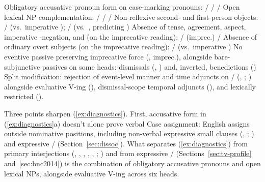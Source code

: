 \documentclass[12pt]{article}
\begin{document}
\ea\label{ex:diagnostics}
\ea Obligatory accusative pronoun form on case-marking pronouns:  /  /  / 
\ex Open lexical NP complementation:  /  /  / 
\ex Non-reflexive second- and first-person objects:  /  (vs.\ imperative );  /  (vs.\ , predicting )
\ex Absence of tense, agreement, aspect, imperative -negation, and  (on the imprecative reading):  /  (imprec.) / 
\ex Absence of ordinary overt subjects (on the imprecative reading):  /  (vs.\ imperative )
\ex No eventive passive preserving imprecative force (, imprec.), alongside bare-subjunctive passives on some heads: dismissals (, ) and, inverted, benedictions ()
\ex Split modification: rejection of event-level manner and time adjuncts on / (, ; \citealp[5--6]{quang1971}) alongside evaluative  V-ing (), dismissal-scope temporal adjuncts (), and lexically restricted  ().
\z
\z

Three points sharpen (\ref{ex:diagnostics}). First, accusative form in (\ref{ex:diagnostics}a) doesn't alone prove verbal Case assignment: English assigns  outside nominative positions, including non-verbal expressive small clauses (, ; \citealp{schutze2001,pottsroeper2006}) and expressive  /  (Section~\ref{sec:dissoc}). What separates (\ref{ex:diagnostics}) from primary interjections (, , , , , ; \citealp{ameka1992,amekawilkins2006,meinard2015}) and from expressive / (Sections~\ref{sec:tv-profile} and~\ref{sec:bnc2014}) is the combination of obligatory accusative pronouns and open lexical NPs, alongside evaluative  V-ing across six heads.
\end{document}
